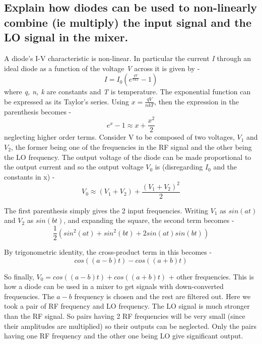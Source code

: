 \documentclass[12pt,a4paper, margin=3in]{article}
\begin{document}
\subsection*{Explain how diodes can be used to non-linearly combine (ie multiply) the input signal and the LO signal in the mixer.} 

\large A diode's I-V characteristic is non-linear. In particular the current \textit{I} through an ideal diode as a function of the voltage \textit{V} across it is given by - \Large \begin{equation} I = I_0 (e^\frac{qV}{   nkT} - 1) \end{equation} 
\large where \textit{q, n, k} are constants and \textit{T} is temperature. The exponential function can be expressed as its Taylor's series. Using $x = \frac{qV}{nkT}$, then the expression in the parenthesis becomes - \Large \begin{equation} e^x - 1 \approx x + \frac{x^2}{2} \end{equation}
\large neglecting higher order terms. Consider V to be composed of two voltages, $V_1$ and $V_2$, the former being one of the frequencies in the RF signal and the other being the LO frequency. The output voltage of the diode can be made proportional to the output current and so the output voltage $V_0$ is (disregarding $I_0$ and the constants in x) - \begin{equation} V_0 \approx (V_1 + V_2) + \frac{(V_1 + V_2)^2}{2} \end{equation} 

The first parenthesis simply gives the 2 input frequencies. Writing $V_1$ as $sin(at)$ and $V_2$ as $sin(bt)$, and expanding the square, the second term becomes - \begin{displaymath} \frac{1}{2}(sin^2(at) + sin^2(bt) + 2 sin(at) sin(bt)) \end{displaymath} 

By trigonometric identity, the cross-product term in this becomes - \begin{displaymath} cos((a - b)t) - cos((a + b)t) \end{displaymath}

So finally, $V_0 = cos((a - b)t) + cos((a + b)t) $ + other frequencies. This is how a diode can be used in a mixer to get signals with down-converted frequencies. The $a - b$ frequency is chosen and the rest are filtered out. Here we took a pair of RF frequency and LO frequency. The LO signal is much stronger than the RF signal. So pairs having 2 RF frequencies will be very small (since their amplitudes are multiplied) so their outputs can be neglected. Only the pairs having one RF frequency and the other one being LO give significant output.  
\end{document}

